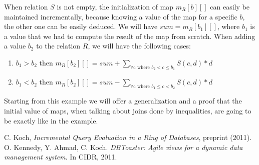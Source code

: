 \documentclass[12pt]{article}
\begin{document}
When relation $S$ is not empty, the initialization of map $m_R[b][]$ can easily be maintained incrementally, because knowing a value of the map for a specific $b$, the other one can be easily deduced. We will have $sum=m_R[b_{1}][]$, where $b_{1}$ is a value that we had to compute the result of the map from scratch. When adding a value $b_{2}$ to the relation $R$, we will have the following cases:

\begin{enumerate}
\item $b_{1}>b_{2}$ then $m_R[b_{2}][]=sum + \sum_{\forall\mbox{c where }b_{2}<c\leq b_{1}} S(c,d)*d$
\item $b_{1}<b_{2}$ then $m_R[b_{2}][]=sum - \sum_{\forall\mbox{c where }b_{1}\leq c<b_{2}} S(c,d)*d$
\end{enumerate}

Starting from this example we will offer a generalization and a proof that the initial value of maps, when talking about joins done by inequalities, are going to be exactly like in the example.

\begin{thebibliography}{9}
 C. Koch, \emph{Incremental Query Evaluation in a Ring of Databases},  preprint (2011).
 O. Kennedy, Y. Ahmad, C. Koch. \emph{DBToaster: Agile views for a dynamic data management system}. In CIDR, 2011.
\end{thebibliography}
\end{document}
